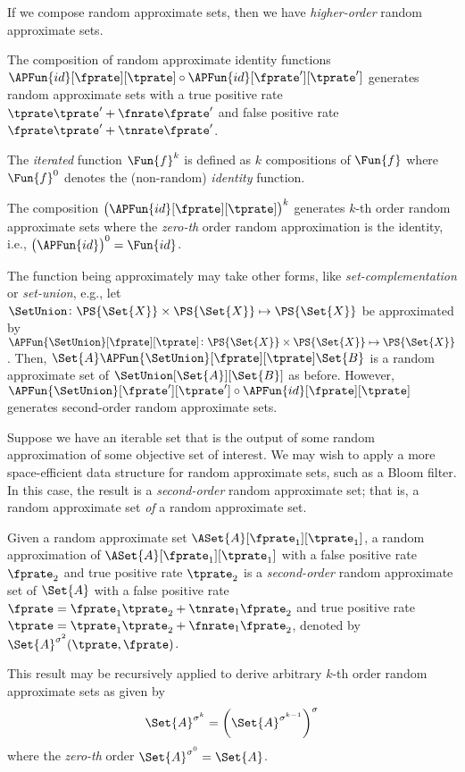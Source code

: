 \documentclass[ ../main.tex]{subfiles}
\begin{document}
If we compose random approximate sets, then we have \emph{higher-order} random approximate sets.
\begin{theorem}
	The composition of random approximate identity functions $\APFun{id}[\fprate][\tprate] \circ \APFun{id}[\fprate'][\tprate']$ generates random approximate sets with a true positive rate $\tprate \tprate' + \fnrate \fprate'$ and false positive rate $\fprate \tprate' + \tnrate \fprate'$.
\end{theorem}

\begin{definition}
	The \emph{iterated} function $\Fun{f}^k$ is defined as $k$ compositions of $\Fun{f}$ where $\Fun{f}^0$ denotes the (non-random) \emph{identity} function.
\end{definition}
The composition $\left(\APFun{id}[\fprate][\tprate]\right)^k$ generates $k$-th order random approximate sets where the \emph{zero-th} order random approximation is the identity, i.e., $\left(\APFun{id}\right)^0 = \Fun{id}$.

The function being approximately may take other forms, like \emph{set-complementation} or \emph{set-union}, e.g.,
let $\SetUnion \colon \PS{\Set{X}} \times \PS{\Set{X}} \mapsto \PS{\Set{X}}$ be approximated by $\APFun{\SetUnion}[\fprate][\tprate] \colon \PS{\Set{X}} \times \PS{\Set{X}} \mapsto \PS{\Set{X}}$.
Then, $\Set{A} \APFun{\SetUnion}[\fprate][\tprate] \Set{B}$ is a random approximate set of $\SetUnion[\Set{A}][\Set{B}]$ as before.
However, $\APFun{\SetUnion}[\fprate'][\tprate'] \circ \APFun{id}[\fprate][\tprate]$ generates second-order random approximate sets.

Suppose we have an iterable set that is the output of some random approximation of some objective set of interest.
We may wish to apply a more space-efficient data structure for random approximate sets, such as a Bloom filter\cite{bf}.
In this case, the result is a \emph{second-order} random approximate set; that is, a random approximate set \emph{of} a random approximate set.
\begin{theorem}
	Given a random approximate set $\ASet{A}[\fprate_1][\tprate_1]$, a random approximation of $\ASet{A}[\fprate_1][\tprate_1]$ with a false positive rate $\fprate_2$ and true positive rate $\tprate_2$ is a \emph{second-order} random approximate set of $\Set{A}$ with a false positive rate $\fprate = \fprate_1 \tprate_2 + \tnrate_1 \fprate_2$ and true positive rate $\tprate = \tprate_1 \tprate_2 + \fnrate_1 \fprate_2$, denoted by $\Set{A}^{\sigma^2}(\tprate,\fprate)$.
	
	This result may be recursively applied to derive arbitrary $k$-th order random approximate sets as given by
	\begin{equation}
		\Set{A}^{\sigma^k} = \left(\Set{A}^{\sigma^{k-1}}\right)^{\sigma}
	\end{equation}
	where the \emph{zero-th} order $\Set{A}^{\sigma^0} = \Set{A}$.
\end{theorem}
\end{document}
